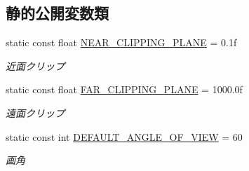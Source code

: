 \subsection*{静的公開変数類}
\begin{DoxyCompactItemize}
\item 
static const float \mbox{\hyperlink{class_camera_ad2e91249b7878a87cd23cf7dd5d86e00}{N\+E\+A\+R\+\_\+\+C\+L\+I\+P\+P\+I\+N\+G\+\_\+\+P\+L\+A\+NE}} = 0.\+1f
\begin{DoxyCompactList}\small\item\em 近面クリップ \end{DoxyCompactList}\item 
static const float \mbox{\hyperlink{class_camera_a90ee4c7f7bbcb5d2b0ab86d14ed60d90}{F\+A\+R\+\_\+\+C\+L\+I\+P\+P\+I\+N\+G\+\_\+\+P\+L\+A\+NE}} = 1000.\+0f
\begin{DoxyCompactList}\small\item\em 遠面クリップ \end{DoxyCompactList}\item 
static const int \mbox{\hyperlink{class_camera_a0e0f326c66006cf7f9dc29b3e2b86b81}{D\+E\+F\+A\+U\+L\+T\+\_\+\+A\+N\+G\+L\+E\+\_\+\+O\+F\+\_\+\+V\+I\+EW}} = 60
\begin{DoxyCompactList}\small\item\em 画角 \end{DoxyCompactList}\end{DoxyCompactItemize}
